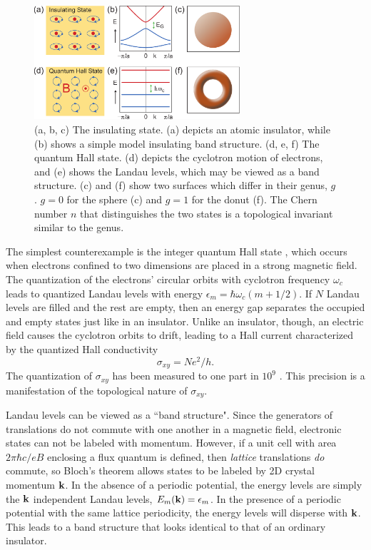 \documentclass[twocolumn,floatfix,showpacs,rmp,aps]{revtex4}
\begin{document}
\begin{figure}
\includegraphics[width=3in]{Fig1}
\caption{(a, b, c) The insulating state.  (a) depicts an atomic insulator, while
(b) shows a simple model insulating band structure.  (d, e, f) The quantum Hall state.
(d) depicts the cyclotron motion of electrons, and (e) shows the Landau levels, which may
be viewed as a band structure.  (c) and (f) show two surfaces which differ in their genus, $g$.
$g=0$ for the sphere (c) and $g=1$ for the donut (f).  The Chern number $n$ that distinguishes
the two states is a topological invariant similar to the genus.}
\label{fig:insulator}
\end{figure}

The simplest counterexample is the integer quantum Hall state
\cite{vonklitzing80,prange87}, which
occurs when electrons confined to two dimensions are placed in a
strong magnetic field.  The quantization of the electrons' circular
orbits with cyclotron frequency $\omega_c$
leads to quantized Landau levels with
energy $\epsilon_m=\hbar\omega_c (m+1/2)$.
If $N$ Landau levels are filled and the rest are empty, then an energy gap
separates the occupied and empty states just like in an
insulator.  Unlike an insulator, though, an electric field causes
the cyclotron orbits to drift, leading to a Hall
current characterized by the quantized  Hall conductivity
\begin{equation}
\sigma_{xy} = N e^2/h.
\label{qhall}
\end{equation}
The quantization of $\sigma_{xy}$ has been measured to
one part in $10^9$ \cite{vonklitzing05}.  This precision is a
manifestation of the topological nature of $\sigma_{xy}$.

Landau levels can be viewed as a ``band
structure".  Since the generators of translations do not commute with one another
in a magnetic field, electronic states can
not be labeled with momentum.  However, if a unit cell with
area $2\pi \hbar c/e B$ enclosing a
flux quantum is defined, then {\it lattice} translations
{\it do} commute, so Bloch's theorem allows states to be labeled by
2D crystal momentum ${\bf k}$.  In the absence of a periodic potential,
the energy levels are simply the ${\bf k}$ independent
Landau levels, $E_m({\bf k}) = \epsilon_m$.  In the presence of a periodic potential
with the same lattice periodicity, the energy levels will
disperse with ${\bf k}$.   This leads to a band structure
that looks identical to that of an ordinary insulator.
\end{document}
